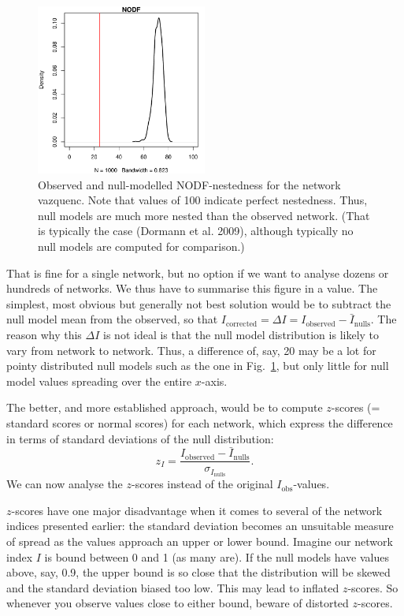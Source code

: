 \documentclass[a4paper, 11pt]{article}
\newcommand{\ind}[1]{#1\index{#1}}           			   %
\begin{document}
\begin{figure}
\centering
\includegraphics[width=0.5\textwidth]{figures/NODFnull}
\caption{Observed and null-modelled NODF-nestedness for the network vazquenc. Note that values of 100 indicate perfect nestedness. Thus, null models are much more nested than the observed network. (That is typically the case (Dormann et al. 2009), although typically no null models are computed for comparison.)}
\label{fig:NODFnull}
\end{figure}
%
That is fine for a single network, but no option if we want to analyse dozens or hundreds of networks. We thus have to summarise this figure in a value. The simplest, most obvious but generally not best solution would be to subtract the null model mean from the observed, so that $I_\text{corrected} = \Delta I= I_\text{observed} - \bar{I}_\text{nulls}$. The reason why this $\Delta I$ is not ideal is that the null model distribution is likely to vary from network to network. Thus, a difference of, say, 20 may be a lot for pointy distributed null models such as the one in Fig.~\ref{fig:NODFnull}, but only little for null model values spreading over the entire $x$-axis.

The better, and more established approach, would be to compute $z$-scores (= \ind{standard score}s or \ind{normal score}s) for each network, which express the difference in terms of standard deviations of the null distribution: 
\[z_I= \frac{I_\text{observed} - \bar{I}_\text{nulls}}{\sigma_{I_\text{nulls}}}.\] We can now analyse the $z$-scores instead of the original $I_\text{obs}$-values.

$z$-scores have one major disadvantage when it comes to several of the network indices presented earlier: the standard deviation becomes an unsuitable measure of spread as the values approach an upper or lower bound. Imagine our network index $I$ is bound between 0 and 1 (as many are). If the null models have values above, say, 0.9, the upper bound is so close that the distribution will be skewed and the standard deviation biased too low. This may lead to inflated $z$-scores. So whenever you observe values close to either bound, beware of distorted $z$-scores.
\end{document}
